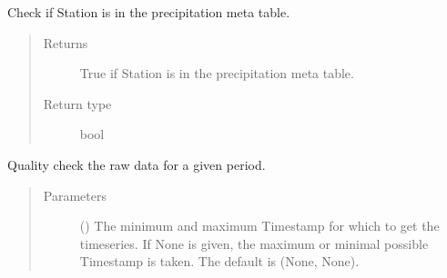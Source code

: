 \documentclass[letterpaper,10pt,english]{sphinxmanual}
\begin{document}
\begin{fulllineitems}
\begin{fulllineitems}
\begin{quote}
\begin{description}
\end{description}\end{quote}

\end{fulllineitems}


\begin{fulllineitems}
\label{\detokenize{weatherDB:weatherDB.station.StationTETBase.isin_meta_n}}
\sphinxAtStartPar
Check if Station is in the precipitation meta table.
\begin{quote}\begin{description}
\item[{Returns}] \leavevmode
\sphinxAtStartPar
True if Station is in the precipitation meta table.

\item[{Return type}] \leavevmode
\sphinxAtStartPar
bool

\end{description}\end{quote}

\end{fulllineitems}


\begin{fulllineitems}
\label{\detokenize{weatherDB:weatherDB.station.StationTETBase.quality_check}}
\sphinxAtStartPar
Quality check the raw data for a given period.
\begin{quote}\begin{description}
\item[{Parameters}] \leavevmode
\sphinxAtStartPar
{} (\sphinxstyleliteralemphasis{\sphinxupquote{(}}\sphinxstyleliteralemphasis{\sphinxupquote{)}}\sphinxstyleliteralemphasis{\sphinxupquote{, }}) \textendash{} The minimum and maximum Timestamp for which to get the timeseries.
If None is given, the maximum or minimal possible Timestamp is taken.
The default is (None, None).


\end{description}
\end{quote}
\end{fulllineitems}
\end{fulllineitems}
\end{document}
